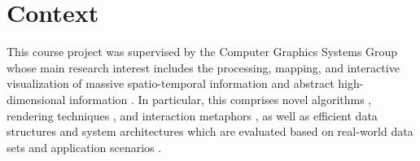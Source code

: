 

\section{Context}
\label{sec:Context}
This course project was supervised by the Computer Graphics Systems Group whose main research interest includes the processing, mapping, and interactive visualization of massive spatio-temporal information \cite{Oehlke2015,Buschmann2015,Buschmann2014,Maass2006} and abstract high-dimensional information \cite{Limberger2017,Limberger2016,Wuerfel2015}. In particular, this comprises novel algorithms \cite{RichterKyprianidis2013,RichterBehrens2013,Glander2012}, rendering techniques \cite{Semmo2016,Pasewaldt2014,Maass2006a,Doellner2005}, and interaction metaphors \cite{Semmo2016a,Scheibel2016,Semmo2014}, as well as efficient data structures \cite{Scheibel2017,Richter2015} and system architectures \cite{Klimke2014,Trapp2012,Klimke2010} which are evaluated based on real-world data sets and application scenarios \cite{Discher2016,Trapp2015,Engel2012}.
